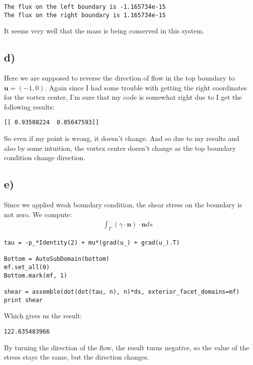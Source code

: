 \documentclass[a4paper,norsk]{article}
\begin{document}
\begin{lstlisting}[style=terminal]
The flux on the left boundary is -1.165734e-15
The flux on the right boundary is 1.165734e-15
\end{lstlisting}
It seems very well that the mass is being conserved in this system.

\subsection*{d)}
Here we are supposed to reverse the direction of flow in the top boundary to $ \textbf{u} = (-1,0)$. Again since I had some trouble with getting the right coordinates for the vortex center, I'm sure that my code is somewhat right due to I get the following results:

\begin{lstlisting}[style=terminal]
[[ 0.93508224  0.05647593]]
\end{lstlisting}
So even if my point is wrong, it doesn't change. And so due to my results and also by some intuition, the vortex center doesn't change as the top boundary condition change direction. 

\subsection*{e)}
Since we applied weak boundary condition, the shear stress on the boundary is not zero. We compute:
\begin{align*}
	\int_{\Gamma}{}(\gamma \cdot \textbf{n}) \cdot \textbf{n} ds
\end{align*}

\begin{lstlisting}[style=python]
tau = -p_*Identity(2) + mu*(grad(u_) + grad(u_).T)

Bottom = AutoSubDomain(bottom)
mf.set_all(0)
Bottom.mark(mf, 1)

shear = assemble(dot(dot(tau, n), n)*ds, exterior_facet_domains=mf)
print shear
\end{lstlisting}
Which gives us the result:
\begin{lstlisting}[style=terminal]
122.635483966
\end{lstlisting}
By turning the direction of the flow, the result turns negative, so the value of the stress stays the same, but the direction changes. 
\newpage

\end{document}
